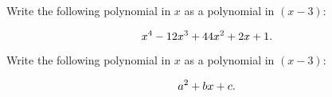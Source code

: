 \documentclass[12pt,letterpaper]{hmcpset}
\newcommand{\pn}[1]{\left( #1 \right)}
\begin{document}
\begin{problem}[20.2.ii]

    Write the following polynomial in $x$ as a polynomial in $\pn{x-3}$:

    \[
        x^4 - 12x^3 + 44x^2 + 2x + 1.\\
    \]

\end{problem}

\begin{solution}

\end{solution}

\begin{problem}[20.2.iv]

    Write the following polynomial in $x$ as a polynomial in $\pn{x-3}$:

    \[
        a^2 + bx + c.\\
    \]

\end{problem}

\begin{solution}

\end{solution}
\end{document}
